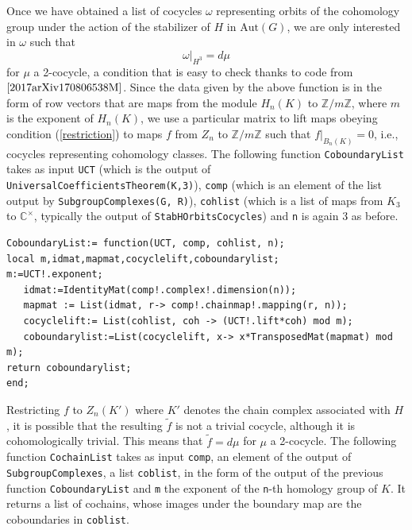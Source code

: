 \documentclass[a4paper, 10pt]{book}
\theoremstyle{definition}
\numberwithin{equation}{chapter}
\newcommand\lstl{\lstinline}
\newcommand\CC{\mathbb C}
\newcommand\ZZ{\mathbb Z}
\begin{document}
Once we have obtained a list of cocycles $\omega$ representing orbits of the cohomology group under the action of the stabilizer of $H$ in $\text{Aut}(G)$, we are only interested in $\omega$ such that \begin{equation}\label{restriction}
	\omega|_{H^3} = d\mu
\end{equation} for $\mu$ a 2-cocycle, a condition that is easy to check thanks to code from $\cite{2017arXiv170806538M}$. Since the data given by the above function is in the form of row vectors that are maps from the module $H_n(K)$ to $\ZZ/m\ZZ$, where $m$ is the exponent of $H_n(K)$, we use a particular matrix to lift maps obeying condition (\ref{restriction}) to maps $f$ from $Z_n$ to $\ZZ/m\ZZ$ such that $f|_{B_n(K)} = 0$, i.e., cocycles representing cohomology classes. The following function \lstl{CoboundaryList} takes as input \lstl{UCT} (which is the output of \lstl{UniversalCoefficientsTheorem(K,3)}), \lstl{comp} (which is an element of the list output by \lstl{SubgroupComplexes(G, R)}), \lstl{cohlist} (which is a list of maps from $K_3$ to $\CC^\times$, typically the output of \lstl{StabHOrbitsCocycles}) and \lstl{n} is again 3 as before.

\begin{lstlisting}
CoboundaryList:= function(UCT, comp, cohlist, n);
local m,idmat,mapmat,cocyclelift,coboundarylist;
m:=UCT!.exponent;
   idmat:=IdentityMat(comp!.complex!.dimension(n));
   mapmat := List(idmat, r-> comp!.chainmap!.mapping(r, n));
   cocyclelift:= List(cohlist, coh -> (UCT!.lift*coh) mod m);
   coboundarylist:=List(cocyclelift, x-> x*TransposedMat(mapmat) mod m);
return coboundarylist;
end;
\end{lstlisting}

Restricting $f$ to $Z_n(K')$ where $K'$ denotes the chain complex associated with $H$, it is possible that the resulting $\tilde{f}$ is not a trivial cocycle, although it is cohomologically trivial. This means that $\tilde{f} = d\mu$ for $\mu$ a 2-cocycle. The following function \lstl{CochainList} takes as input \lstl{comp}, an element of the output of \lstl{SubgroupComplexes}, a list \lstl{coblist}, in the form of the output of the previous function \lstl{CoboundaryList} and  \lstinline{m} the exponent of the \lstinline{n}-th homology group of $K$. It returns a list of cochains, whose images under the boundary map are the coboundaries in \lstl{coblist}.
\end{document}
